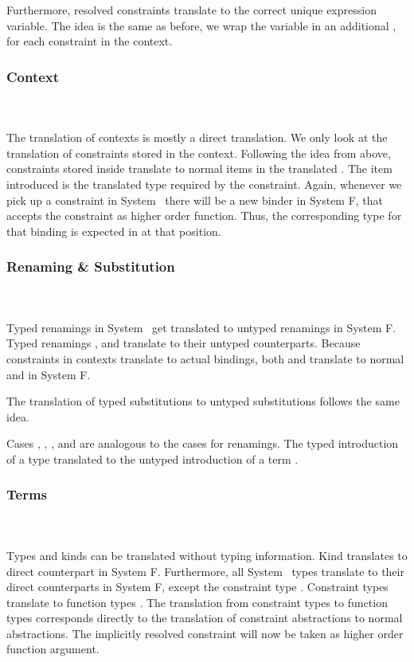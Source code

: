 \noindent Furthermore, resolved constraints translate to the correct unique expression variable. 
\DPTOVar
The idea is the same as before, we wrap the variable in an additional , for each constraint in the context.

\subsubsection{Context}\hfill\\\\
The translation of contexts is mostly a direct translation. 
We only look at the translation of constraints stored in the context.
\DPTCtx
Following the idea from above, constraints  \Constr{:}  stored inside  translate to normal items in the translated . 
The item introduced is the translated type   required by the constraint. Again, whenever we pick up a constraint in System \Fo\, there will be a new binder in System F, that accepts the constraint as higher order function. 
Thus, the corresponding type for that binding is expected in  at that position.

\subsubsection{Renaming \& Substitution}\hfill\\\\
Typed renamings in System \Fo\ get translated to untyped renamings in System F.
\DPTRen
Typed renamings ,  and  translate to their untyped counterparts. 
Because constraints in contexts translate to actual bindings, both  and  translate to normal  and  in System F.

\noindent The translation of typed substitutions to untyped substitutions follows the same idea.

\DPTSub 

Cases , , ,  and  are analogous to the cases for renamings. 
The typed introduction of a type  translated to the untyped introduction of a term .

\subsubsection{Terms}\hfill\\\\
Types and kinds can be translated without typing information. Kind  translates to direct counterpart in System F. 
Furthermore, all System \Fo\ types translate to their direct counterparts in System F, except the constraint type \Constr{[}  \Constr{:}  \Constr{]⇒} .
\DPTType
Constraint types  \Constr{[}  \Constr{:}  \Constr{]⇒}  translate to function types   . 
The translation from constraint types to function types corresponds directly to the translation of constraint abstractions to normal abstractions. 
The implicitly resolved constraint will now be taken as higher order function argument.

